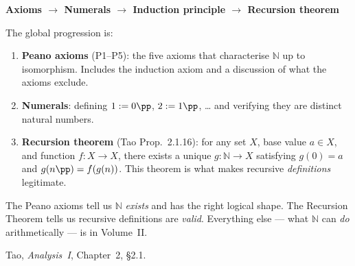\begin{center}
\textbf{Axioms $\longrightarrow$ Numerals
$\longrightarrow$ Induction principle $\longrightarrow$ Recursion theorem}
\end{center}

The global progression is:
\begin{enumerate}
  \item \textbf{Peano axioms} (P1--P5): the five axioms that characterise
        $\mathbb{N}$ up to isomorphism. Includes the induction axiom
        and a discussion of what the axioms exclude.
  \item \textbf{Numerals}: defining $1 := 0\pp$, $2 := 1\pp$, \ldots{}
        and verifying they are distinct natural numbers.
  \item \textbf{Recursion theorem} (Tao Prop.~2.1.16):
        for any set $X$, base value $a \in X$, and function $f : X \to X$,
        there exists a unique $g : \mathbb{N} \to X$ satisfying
        $g(0) = a$ and $g(n\pp) = f(g(n))$.
        This theorem is what makes recursive \emph{definitions} legitimate.
\end{enumerate}

\vspace{1em}

\begin{remark}
The Peano axioms tell us $\mathbb{N}$ \emph{exists} and has the right
logical shape. The Recursion Theorem tells us recursive definitions
are \emph{valid}. Everything else --- what $\mathbb{N}$ can \emph{do}
arithmetically --- is in Volume~II.
\end{remark}

\begin{remark}
Tao, \textit{Analysis~I}, Chapter~2, §2.1.
\end{remark}







